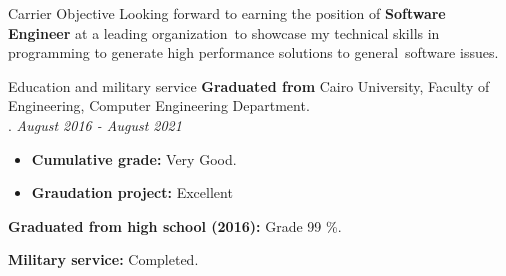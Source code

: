 \documentclass{resume}
\begin{document}

\begin{rSection}{Carrier Objective}
    Looking forward to earning the position of \textbf{Software Engineer} at a leading organization\
    to showcase my technical skills in programming to generate high performance solutions to general\ 
    software issues.
\end{rSection}


\begin{rSection}{Education and military service}
    \textbf{Graduated from} Cairo University, Faculty of Engineering, Computer Engineering Department.\\ . \hfill {\em August 2016 - August 2021}
    \begin{itemize}
        \item \textbf{Cumulative grade:} Very Good. 
        \item \textbf{Graudation project:} Excellent\\
    \end{itemize}

    \textbf{Graduated from high school (2016):} Grade 99 \%.

    \textbf{Military service:} Completed.

\end{rSection}

\end{document}
